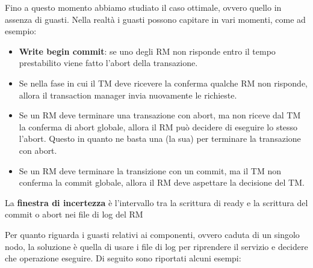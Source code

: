 Fino a questo momento abbiamo studiato il caso ottimale, ovvero quello in assenza
di guasti. Nella realtà i guasti possono capitare in vari momenti, come ad esempio:
\begin{itemize}
      \item \textbf{Write begin commit}: se uno degli RM non risponde entro il tempo
            prestabilito viene fatto l'abort della transazione.
      \item Se nella fase in cui il TM deve ricevere la conferma qualche RM non
            risponde, allora il transaction manager invia nuovamente le richieste.
      \item Se un RM deve terminare una transazione con abort, ma non riceve dal TM
            la conferma di abort globale, allora il RM può decidere di eseguire lo stesso
            l'abort. Questo in quanto ne basta una (la sua) per terminare la
            transazione con abort.
      \item Se un RM deve terminare la transizione con un commit, ma il TM non
            conferma la commit globale, allora il RM deve aspettare la decisione
            del TM.
\end{itemize}
\begin{nota}
      La \textbf{finestra di incertezza} è l'intervallo tra la scrittura di ready
      e la scrittura del commit o abort nei file di log del RM
\end{nota}
Per quanto riguarda i guasti relativi ai componenti, ovvero caduta di
un singolo nodo, la soluzione è quella di
usare i file di log per riprendere il servizio e decidere che operazione eseguire.
Di seguito sono riportati alcuni esempi:
